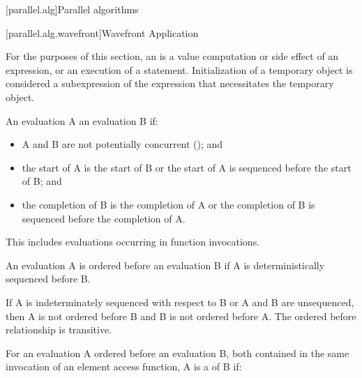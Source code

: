 
[parallel.alg]{Parallel algorithms}

[parallel.alg.wavefront]{Wavefront Application}

\pnum
For the purposes of this section, an  is a value
computation or side effect of an expression, or an execution of a statement.
Initialization of a temporary object is considered a subexpression of the
expression that necessitates the temporary object.

\pnum
An evaluation A  an evaluation B if:

\begin{itemize}
\item A and B are not potentially concurrent (); and
\item the start of A is the start of B or the start of A is sequenced before the start of B; and
\item the completion of B is the completion of A or the completion of B is sequenced before the completion of A.
\end{itemize}

\begin{note}
This includes evaluations occurring in function invocations.
\end{note}

\pnum
An evaluation A is ordered before an evaluation B if A is
deterministically sequenced before B. \begin{note}If A is indeterminately
sequenced with respect to B or A and B are unsequenced, then A is not ordered
before B and B is not ordered before A. The ordered before relationship is
transitive.\end{note}

\pnum
For an evaluation A ordered before an evaluation B, both contained in the
same invocation of an element access function, A is a  of B if:


